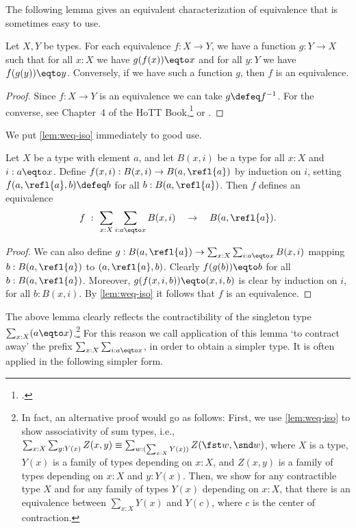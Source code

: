 The following lemma gives an equivalent characterization
of equivalence that is sometimes easy to use.

\begin{lemma}\label{lem:weq-iso}
  Let $X,Y$ be types. For each equivalence $f: X\to Y$, we have a function $g: Y\to X$ such that for all $x:X$ we have $g(f(x)) \eqto x$ and for all
  $y:Y$ we have $f(g(y)) \eqto y$. Conversely, if we have such a function $g$, then $f$ is an equivalence.
\end{lemma}
\begin{proof}
Since $f: X\to Y$ is an equivalence we can take $g \defeq f^{-1}$.
For the converse, see Chapter~4 of the HoTT Book,\footcite{hottbook} or .
\end{proof}

We put \cref{lem:weq-iso} immediately to good use.

\begin{lemma}\label{lem:contract-away}
Let $X$ be a type with element $a$, and let
$B(x,i)$ be a type for all $x:X$ and $i: a \eqto x$.
Define $f(x,i): B(x,i) \to B(a,\refl{a})$ by induction on $i$,
setting $f(a,\refl{a},b) \defeq b$ for all $b:B(a,\refl{a})$.
Then $f$ defines an equivalence
\[
f~:~ \sum_{x:X} \sum_{i: a \eqto x} B(x,i) \quad \to \quad B(a,\refl{a}).
\]
\end{lemma}
\begin{proof}
We can also define
$g: B(a,\refl{a})\to \sum_{x:X} \sum_{i: a \eqto x} B(x,i)$
mapping $b: B(a,\refl{a})$ to $(a,\refl{a},b)$.
Clearly $f(g(b)) \eqto b$ for all $b:B(a,\refl{a})$.
Moreover, $g(f(x,i,b)) \eqto (x,i,b)$ is clear by induction
on $i$, for all $b:B(x,i)$.
By \cref{lem:weq-iso} it follows that $f$
is an equivalence.
\end{proof}

The above lemma clearly reflects the  contractibility of the
singleton type $\sum_{x:X}(a \eqto x)$.\footnote{%
  In fact, an alternative proof would go as follows:
  First, we use \cref{lem:weq-iso} to show associativity of sum types,
  i.e., $\sum_{x:X}\sum_{y:Y(x)}Z(x,y)
  \equiv \sum_{w : (\sum_{x:X}Y(x))}Z(\fst w,\snd w)$,
  where $X$ is a type,
  $Y(x)$ is a family of types depending on $x:X$,
  and $Z(x,y)$ is a family of types depending on $x:X$ and $y:Y(x)$.
  Then, we show for any contractible type $X$
  and for any family of types $Y(x)$ depending on $x:X$,
  that there is an equivalence between $\sum_{x:X}Y(x)$ and $Y(c)$,
  where $c$ is the center of contraction.}
For this reason
we call application of this lemma `to contract away'
the prefix $\sum_{x:X} \sum_{i: a \eqto x}$, in order
to obtain a simpler type. It is often applied
in the following simpler form.

